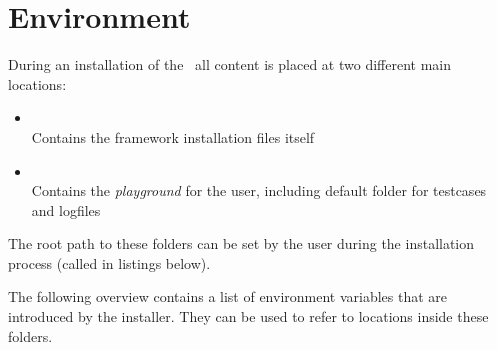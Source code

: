%
%
%

\chapter{Environment}

During an installation of the \rfw\ all content is placed at two different main locations:

\begin{itemize}
   \item {}\\
         Contains the framework installation files itself
   \item {}\\
         Contains the \textit{playground} for the user, including default folder for testcases and logfiles
\end{itemize}

The root path to these folders can be set by the user during the installation process (called  in listings below).

The following overview contains a list of environment variables that are introduced by the installer. They can be used
to refer to locations inside these folders.


